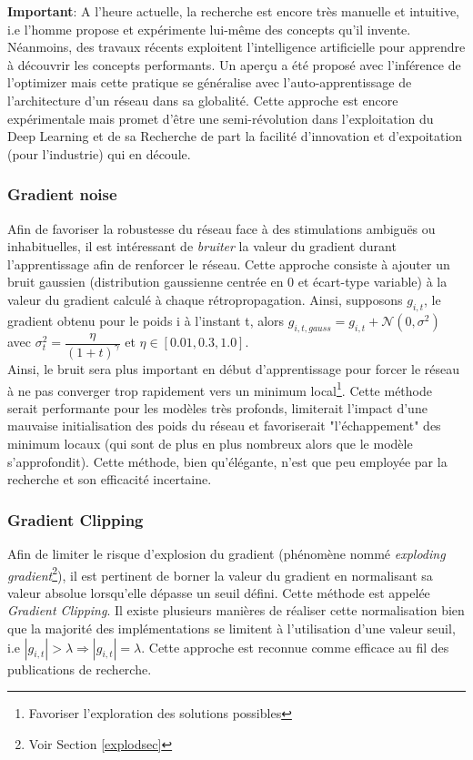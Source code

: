 \noindent \textbf{Important}: A l'heure actuelle, la recherche est encore très manuelle et intuitive, i.e l'homme propose et expérimente lui-même des concepts qu'il invente. Néanmoins, des travaux récents exploitent l'intelligence artificielle pour apprendre à découvrir les concepts performants. Un aperçu a été proposé avec l'inférence de l'optimizer mais cette pratique se généralise avec l'auto-apprentissage de l'architecture d'un réseau dans sa globalité. Cette approche est encore expérimentale mais promet d'être une semi-révolution dans l'exploitation du Deep Learning et de sa Recherche de part la facilité d'innovation et d'expoitation (pour l'industrie) qui en découle.

\subsubsection{Gradient noise}

Afin de favoriser la robustesse du réseau face à des stimulations ambiguës ou inhabituelles, il est intéressant de \textit{bruiter}\cite{gauss_deep} la valeur du gradient durant l'apprentissage afin de renforcer le réseau. Cette approche consiste à ajouter un bruit gaussien (distribution gaussienne centrée en 0 et écart-type variable) à la valeur du gradient calculé à chaque rétropropagation. Ainsi, supposons $g_{i,t}$, le gradient obtenu pour le poids i à l'instant t, alors $g_{i,t,gauss}= g_{i,t} + \mathcal{N}(0,\sigma^2)$ avec $\sigma^2_t = \dfrac{\eta}{(1 + t)^\gamma}$ et $\eta \in [0.01,0.3,1.0]$.\\

\noindent Ainsi, le bruit sera plus important en début d'apprentissage pour forcer le réseau à ne pas converger trop rapidement vers un minimum local\footnote{Favoriser l'exploration des solutions possibles}. Cette méthode serait performante pour les modèles très profonds, limiterait l'impact d'une mauvaise initialisation des poids du réseau et favoriserait "l'échappement" des minimum locaux (qui sont de plus en plus nombreux alors que le modèle s'approfondit). Cette méthode, bien qu'élégante, n'est que peu employée par la recherche et son efficacité incertaine.

\subsubsection{Gradient Clipping}
Afin de limiter le risque d'explosion du gradient (phénomène nommé \textit{exploding gradient}\footnote{Voir Section \ref{explodsec}}), il est pertinent de borner la valeur du gradient en normalisant sa valeur absolue lorsqu'elle dépasse un seuil défini. Cette méthode est appelée \textit{Gradient Clipping}\cite{clip_deep}. Il existe plusieurs manières de réaliser cette normalisation bien que la majorité des implémentations se limitent à l'utilisation d'une valeur seuil, i.e $|g_{i,t}|>\lambda \Rightarrow |g_{i,t}| = \lambda$. Cette approche est reconnue comme efficace au fil des publications de recherche.

